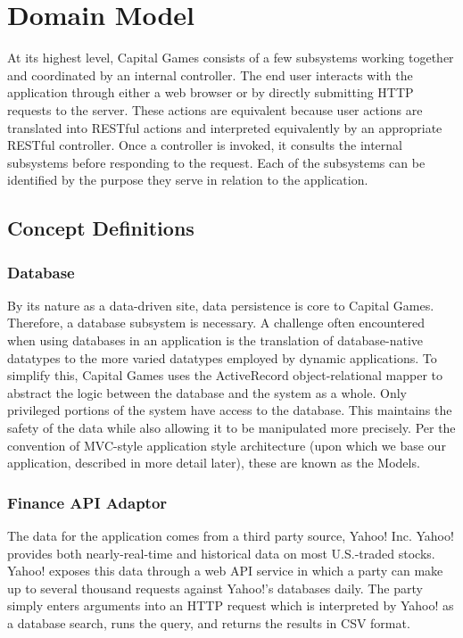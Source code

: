 \chapter{Domain Model}


At its highest level, Capital Games consists of a few subsystems
working together and coordinated by an internal controller. The
end user interacts with the application through either a web browser
or by directly submitting HTTP requests to the server. These actions
are equivalent because user actions are translated into RESTful actions
and interpreted equivalently by an appropriate RESTful controller. \cite{wiki:restful}
Once a controller is invoked, it consults the 
internal subsystems before responding to the request. Each of the 
subsystems can be identified by the purpose they serve in relation
to the application. 

\section{Concept Definitions}

\subsection{Database}
By its nature as a data-driven site, data persistence
is core to Capital Games. Therefore, a database subsystem is necessary. 
A challenge often encountered when using databases in an application is
the translation of database-native datatypes to the more varied datatypes
employed by dynamic applications. \cite{wiki:orm} To simplify this,
Capital Games uses the ActiveRecord object-relational mapper to abstract
the logic between the database and the system as a whole. Only privileged portions
of the system have access to the database. This maintains the safety of the
data while also allowing it to be manipulated more precisely. Per the convention
of MVC-style application style architecture 
(upon which we base our application, described in more detail later), these 
are known as the Models.

\subsection{Finance API Adaptor}
The data for the application comes from a third party source, Yahoo! Inc. Yahoo!
provides both nearly-real-time and historical data on most U.S.-traded stocks.
Yahoo! exposes this data through a web API service in which a party can make
up to several thousand requests against Yahoo!'s databases daily. The party
simply enters arguments into an HTTP request which is interpreted by Yahoo!
as a database search, runs the query, and returns the results in CSV format. \cite{gummy}

